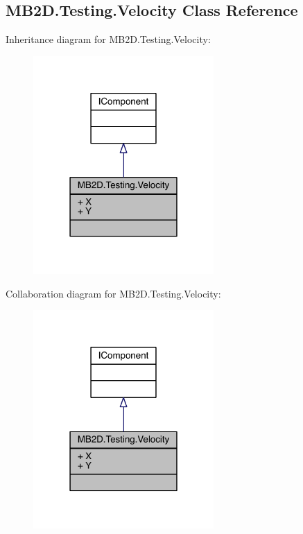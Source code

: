 \hypertarget{class_m_b2_d_1_1_testing_1_1_velocity}{}\subsection{M\+B2\+D.\+Testing.\+Velocity Class Reference}
\label{class_m_b2_d_1_1_testing_1_1_velocity}


Inheritance diagram for M\+B2\+D.\+Testing.\+Velocity\+:
\nopagebreak
\begin{figure}[H]
\begin{center}
\leavevmode
\includegraphics[width=195pt]{class_m_b2_d_1_1_testing_1_1_velocity__inherit__graph}
\end{center}
\end{figure}


Collaboration diagram for M\+B2\+D.\+Testing.\+Velocity\+:
\nopagebreak
\begin{figure}[H]
\begin{center}
\leavevmode
\includegraphics[width=195pt]{class_m_b2_d_1_1_testing_1_1_velocity__coll__graph}
\end{center}
\end{figure}
